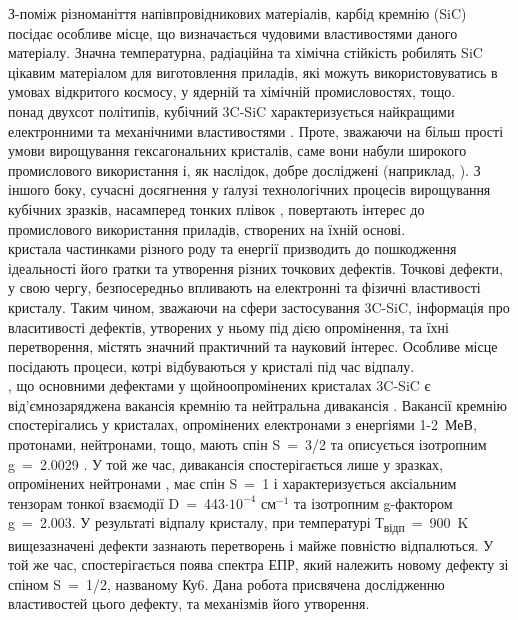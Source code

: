З-поміж різноманіття напівпровідникових матеріалів, карбід кремнію (SiC) посідає особливе місце, що визначається чудовими властивостями даного матеріалу. Значна температурна, радіаційна та хімічна стійкість робилять SiC цікавим матеріалом для виготовлення приладів, які можуть використовуватись в умовах відкритого космосу, у ядерній та хімічній промисловостях, тощо.\\
 понад двухсот політипів, кубічний 3C-SiC характеризується найкращими електронними та механічними властивостями \citep{choy1}. Проте, зважаючи на більш прості умови вирощування гексагональних кристалів, саме вони набули широкого промислового використання і, як наслідок, добре досліджені (наприклад, \citep{hex1, hex2}). З іншого боку, сучасні досягнення у ґалузі технологічних процесів вирощування кубічних зразків, насамперед тонких плівок \citep{epilay}, повертають інтерес до промислового використання приладів, створених на їхній основі.\\
 кристала частинками різного роду та енергії призводить до пошкодження ідеальності його ґратки та утворення різних точкових дефектів. Точкові дефекти, у свою чергу, безпосередньо впливають на електронні та фізичні властивості кристалу. Таким чином, зважаючи на сфери застосування 3C-SiC, інформація про власитивості дефектів, утворених у ньому під дією опромінення, та їхні перетворення, містять значний практичний та науковий інтерес. Особливе місце посідають процеси, котрі відбуваються у кристалі під час відпалу.\\
, що основними дефектами у щойноопромінених кристалах 3C-SiC є від'ємнозаряджена вакансія кремнію \citep{t1} та нейтральна дивакансія \citep{ky5}. Вакансії кремнію спостерігались у кристалах, опромінених електронами з енергіями 1-2~МеВ, протонами, нейтронами, тощо, мають спін S~=~3/2 та описується ізотропним g~=~2.0029 \citep{t1}. У той же час, дивакансія спостерігається лише у зразках, опромінених нейтронами \citep{ky5}, має спін S~=~1 і характеризується аксіальним тензорам тонкої взаємодії D~=~443$\cdot10^{-4}$ см$^{-1}$ та ізотропним g-фактором g~=~2.003. У результаті відпалу кристалу, при температурі Т\textsubscript{відп}~=~900~K вищезазначені дефекти зазнають перетворень і майже повністю відпалються. У той же час, спостерігається поява спектра ЕПР, який належить новому дефекту зі спіном S~=~1/2, названому Ку6. Дана робота присвячена дослідженню властивостей цього дефекту, та механізмів його утворення.
